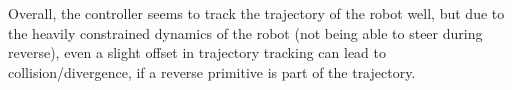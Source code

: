 \documentclass{article}
\begin{document}
\newpage

Overall, the controller seems to track the trajectory of the robot well, but due to the heavily constrained dynamics of the robot (not being able to steer during reverse), even a slight offset in trajectory tracking can lead to collision/divergence, if a reverse primitive is part of the trajectory.
\end{document}
